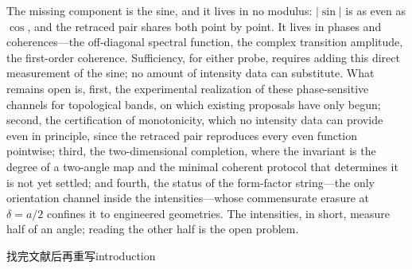 \documentclass[onecolumn,aps,prl,superscriptaddress,longbibliography]{revtex4-2}
\begin{document}
The missing component is the sine, and it lives in no modulus: $|\sin|$ is as even as $\cos$, and the retraced pair shares both point by point. It lives in phases and coherences---the off-diagonal spectral function, the complex transition amplitude, the first-order coherence. Sufficiency, for either probe, requires adding this direct measurement of the sine; no amount of intensity data can substitute. What remains open is, first, the experimental realization of these phase-sensitive channels for topological bands, on which existing proposals have only begun; second, the certification of monotonicity, which no intensity data can provide even in principle, since the retraced pair reproduces every even function pointwise; third, the two-dimensional completion, where the invariant is the degree of a two-angle map and the minimal coherent protocol that determines it is not yet settled; and fourth, the status of the form-factor string---the only orientation channel inside the intensities---whose commensurate erasure at $\delta=a/2$ confines it to engineered geometries. The intensities, in short, measure half of an angle; reading the other half is the open problem.

找完文献后再重写introduction
\appendix


\end{document}
